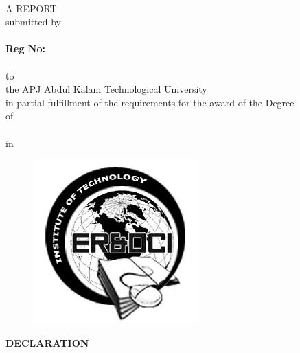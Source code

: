 \documentclass[12pt,a4paper]{report}
\begin{document}
\thispagestyle{empty}
\begin{center}
{\Large{ \textbf{ \projectnameb{}}}}
\vspace{5mm}
\\ \MakeUppercase{A \reportTitle{} report}
\vspace{5mm}
\\submitted by
\\ \textbf{\stud{}}
\\{\textbf{Reg No:\roll{}}}
\vspace{5mm}
\\ \dept{} 
\vspace{5mm}
\\to
\\the APJ Abdul Kalam Technological University
\\in partial fulfillment of the requirements for the award of the Degree
\\of
\\ \degree{}
\\in
\\ \stream{}
\end{center}

\begin{figure}[ht]
\centering
\includegraphics[scale=0.5]{logo}
\end{figure}

\begin{center}
{\dept{}
\vspace{5mm}
\insti{}}
\end{center}

\newpage
\thispagestyle{empty}

\begin{center}
\textbf{DECLARATION}
\end{center}
\end{document}
